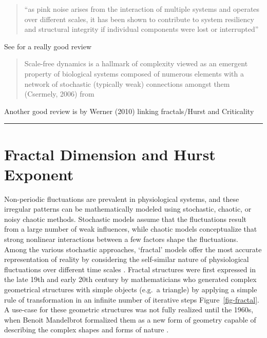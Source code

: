 \documentclass[
  sn-vancouver,
  Numbered,
  referee,
  lineno]{sn-jnl}
\begin{document}
\begin{quote}
``as pink noise arises from the interaction of multiple systems and
operates over different scales, it has been shown to contribute to
system resiliency and structural integrity if individual components were
lost or interrupted''
\citep{lipsitzLossComplexityAging1992, lipsitzDynamicsStabilityPhysiologic2002}
\end{quote}

See \citet{hermanFractalCharacterizationComplexity2009} for a really
good review

\begin{quote}
Scale-free dynamics is a hallmark of complexity viewed as an emergent
property of biological systems composed of numerous elements with a
network of stochastic (typically weak) connections amongst them
(Csermely, 2006) from \citet{mukliImpactHealthyAging2018}
\end{quote}

Another good review is by Werner (2010) linking fractals/Hurst and
Criticality \citet{wernerFractalsNervousSystem2010}

\begin{center}\rule{0.5\linewidth}{0.5pt}\end{center}

\section{Fractal Dimension and Hurst
Exponent}\label{fractal-dimension-and-hurst-exponent}

Non-periodic fluctuations are prevalent in physiological systems, and
these irregular patterns can be mathematically modeled using stochastic,
chaotic, or noisy chaotic methods. Stochastic models assume that the
fluctuations result from a large number of weak influences, while
chaotic models conceptualize that strong nonlinear interactions between
a few factors shape the fluctuations. Among the various stochastic
approaches, `fractal' models offer the most accurate representation of
reality by considering the self-similar nature of physiological
fluctuations over different time scales
\citep{ekeFractalCharacterizationComplexity2002}. Fractal structures
were first expressed in the late 19th and early 20th century by
mathematicians who generated complex geometrical structures with simple
objects (e.g.~a triangle) by applying a simple rule of transformation in
an infinite number of iterative steps Figure~\ref{fig-fractal}. A
use-case for these geometric structures was not fully realized until the
1960s, when Benoit Mandelbrot formalized them as a new form of geometry
capable of describing the complex shapes and forms of nature
\citep{mandelbrotHowLongCoast1967}.
\end{document}
